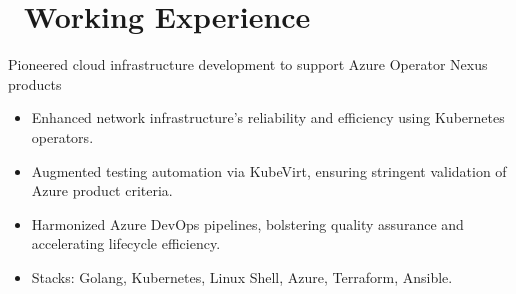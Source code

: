 \documentclass{resume}
\begin{document}
\section{\faUsers\ Working Experience}
Pioneered cloud infrastructure development to support Azure Operator Nexus products
\begin{itemize}
  \item Enhanced network infrastructure's reliability and efficiency using Kubernetes operators.
  \item Augmented testing automation via KubeVirt, ensuring stringent validation of Azure product criteria.
  \item Harmonized Azure DevOps pipelines, bolstering quality assurance and accelerating lifecycle efficiency.
  \item Stacks: Golang, Kubernetes, Linux Shell, Azure, Terraform, Ansible.
\end{itemize}
\end{document}

